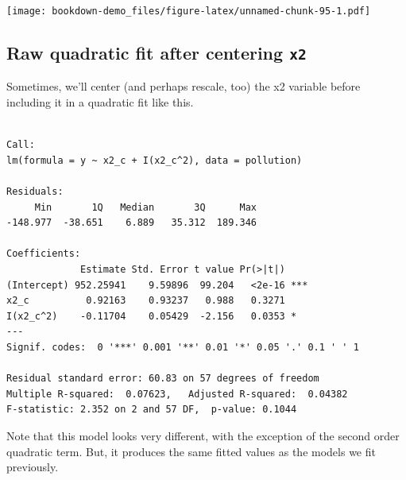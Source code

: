 \documentclass[]{book}
\newenvironment{Shaded}{\begin{snugshade}}{\end{snugshade}}
\newcommand{\KeywordTok}[1]{\textcolor[rgb]{0.13,0.29,0.53}{\textbf{#1}}}
\newcommand{\DataTypeTok}[1]{\textcolor[rgb]{0.13,0.29,0.53}{#1}}
\newcommand{\DecValTok}[1]{\textcolor[rgb]{0.00,0.00,0.81}{#1}}
\newcommand{\StringTok}[1]{\textcolor[rgb]{0.31,0.60,0.02}{#1}}
\newcommand{\OperatorTok}[1]{\textcolor[rgb]{0.81,0.36,0.00}{\textbf{#1}}}
\newcommand{\NormalTok}[1]{#1}
\theoremstyle{definition}
\theoremstyle{definition}
\theoremstyle{definition}
\theoremstyle{remark}
\begin{document}
\texttt{[image: bookdown-demo\_files/figure-latex/unnamed-chunk-95-1.pdf]}

\subsection{\texorpdfstring{Raw quadratic fit after centering
\texttt{x2}}{Raw quadratic fit after centering x2}}\label{raw-quadratic-fit-after-centering-x2}

Sometimes, we'll center (and perhaps rescale, too) the x2 variable
before including it in a quadratic fit like this.

\begin{Shaded}
\end{Shaded}

\begin{verbatim}

Call:
lm(formula = y ~ x2_c + I(x2_c^2), data = pollution)

Residuals:
     Min       1Q   Median       3Q      Max 
-148.977  -38.651    6.889   35.312  189.346 

Coefficients:
             Estimate Std. Error t value Pr(>|t|)    
(Intercept) 952.25941    9.59896  99.204   <2e-16 ***
x2_c          0.92163    0.93237   0.988   0.3271    
I(x2_c^2)    -0.11704    0.05429  -2.156   0.0353 *  
---
Signif. codes:  0 '***' 0.001 '**' 0.01 '*' 0.05 '.' 0.1 ' ' 1

Residual standard error: 60.83 on 57 degrees of freedom
Multiple R-squared:  0.07623,   Adjusted R-squared:  0.04382 
F-statistic: 2.352 on 2 and 57 DF,  p-value: 0.1044
\end{verbatim}

Note that this model looks very different, with the exception of the
second order quadratic term. But, it produces the same fitted values as
the models we fit previously.
\end{document}
